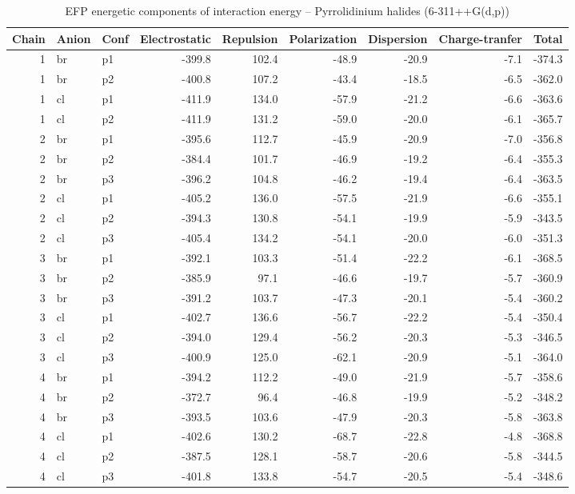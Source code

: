 \documentclass[a4paper]{article}
\begin{document}
\begin{table}[ht]
\centering
\footnotesize
\caption{EFP energetic components of interaction energy -- Pyrrolidinium halides (6-311++G(d,p))}
\begin{tabular}{rllrrrrrr}
  \hline
Chain & Anion & Conf & Electrostatic & Repulsion & Polarization & Dispersion & Charge-tranfer & Total \\ 
  \hline
 1 & br & p1 & -399.8 & 102.4 & -48.9 & -20.9 & -7.1 & -374.3 \\ 
   1 & br & p2 & -400.8 & 107.2 & -43.4 & -18.5 & -6.5 & -362.0 \\ 
   1 & cl & p1 & -411.9 & 134.0 & -57.9 & -21.2 & -6.6 & -363.6 \\ 
   1 & cl & p2 & -411.9 & 131.2 & -59.0 & -20.0 & -6.1 & -365.7 \\ 
   2 & br & p1 & -395.6 & 112.7 & -45.9 & -20.9 & -7.0 & -356.8 \\ 
   2 & br & p2 & -384.4 & 101.7 & -46.9 & -19.2 & -6.4 & -355.3 \\ 
   2 & br & p3 & -396.2 & 104.8 & -46.2 & -19.4 & -6.4 & -363.5 \\ 
   2 & cl & p1 & -405.2 & 136.0 & -57.5 & -21.9 & -6.6 & -355.1 \\ 
   2 & cl & p2 & -394.3 & 130.8 & -54.1 & -19.9 & -5.9 & -343.5 \\ 
   2 & cl & p3 & -405.4 & 134.2 & -54.1 & -20.0 & -6.0 & -351.3 \\ 
   3 & br & p1 & -392.1 & 103.3 & -51.4 & -22.2 & -6.1 & -368.5 \\ 
   3 & br & p2 & -385.9 & 97.1 & -46.6 & -19.7 & -5.7 & -360.9 \\ 
   3 & br & p3 & -391.2 & 103.7 & -47.3 & -20.1 & -5.4 & -360.2 \\ 
   3 & cl & p1 & -402.7 & 136.6 & -56.7 & -22.2 & -5.4 & -350.4 \\ 
   3 & cl & p2 & -394.0 & 129.4 & -56.2 & -20.3 & -5.3 & -346.5 \\ 
   3 & cl & p3 & -400.9 & 125.0 & -62.1 & -20.9 & -5.1 & -364.0 \\ 
   4 & br & p1 & -394.2 & 112.2 & -49.0 & -21.9 & -5.7 & -358.6 \\ 
   4 & br & p2 & -372.7 & 96.4 & -46.8 & -19.9 & -5.2 & -348.2 \\ 
   4 & br & p3 & -393.5 & 103.6 & -47.9 & -20.3 & -5.8 & -363.8 \\ 
   4 & cl & p1 & -402.6 & 130.2 & -68.7 & -22.8 & -4.8 & -368.8 \\ 
   4 & cl & p2 & -387.5 & 128.1 & -58.7 & -20.6 & -5.8 & -344.5 \\ 
   4 & cl & p3 & -401.8 & 133.8 & -54.7 & -20.5 & -5.4 & -348.6 \\ 
   \hline
\end{tabular}
\end{table}
\end{document}
